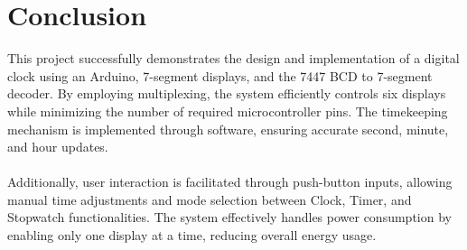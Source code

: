 \documentclass[journal]{IEEEtran}
\begin{document}
\section{Conclusion}
This project successfully demonstrates the design and implementation of a digital clock using an Arduino, 7-segment displays, and the 7447 BCD to 7-segment decoder. By employing multiplexing, the system efficiently controls six displays while minimizing the number of required microcontroller pins. The timekeeping mechanism is implemented through software, ensuring accurate second, minute, and hour updates. \\ \\
Additionally, user interaction is facilitated through push-button inputs, allowing manual time adjustments and mode selection between Clock, Timer, and Stopwatch functionalities. The system effectively handles power consumption by enabling only one display at a time, reducing overall energy usage.
\end{document}
